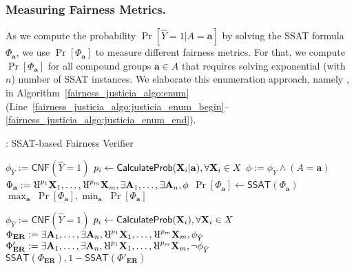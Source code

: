 \subsubsection{Measuring Fairness Metrics.}
As we compute the probability $\Pr[\hat{Y} = 1 | A = \mathbf{a}]$ by solving the SSAT formula $ \Phi_\mathbf{a} $, we  use $ \Pr[\Phi_\mathbf{a}] $ to measure different fairness metrics. 
For that, we compute $ \Pr[\Phi_\mathbf{a}] $ for all compound groups $\mathbf{a} \in A$ that requires solving exponential (with $n$) number of SSAT instances. 
We elaborate this enumeration approach, namely {\justiciaenum}, in Algorithm~\ref{fairness_justicia_algo:enum}  (Line~\ref{fairness_justicia_algo:justicia_enum_begin}--\ref{fairness_justicia_algo:justicia_enum_end}).

\begin{algorithm}[t!]
	\caption{\justicia: SSAT-based Fairness Verifier}
	\label{fairness_justicia_algo:enum}
	\footnotesize
	\begin{algorithmic}[1]
		\label{fairness_justicia_algo:justicia_enum_begin}
		\State $ \phi_{\hat{Y}} := \mathsf{CNF}(\hat{Y} = 1) $
		\State $ p_{i} \leftarrow \mathsf{CalculateProb}(\mathbf{X}_i | \mathbf{a}), \forall \mathbf{X}_i \in X $
		\State $ \phi := \phi_{\hat{Y}} \wedge (A=\mathbf{a}) $
		\State $  \Phi_\mathbf{a} := \R^{p_{1}}\nonsensitive_1, \dots, \R^{p_{m}}\nonsensitive_m, \exists \sensitive_1,\dots, \exists \sensitive_n,  \phi $
		\State $ \Pr[\Phi_\mathbf{a}]  \leftarrow \mathsf{SSAT}(\Phi_\mathbf{a}) $ 
		\EndFor
		\State \Return $ \max_{\mathbf{a}} \; \Pr[\Phi_{\mathbf{a}}], \min_{\mathbf{a}} \; \Pr[\Phi_{\mathbf{a}}] $
		\label{fairness_justicia_algo:justicia_enum_end}
		\EndFunction
		
		
		
		\label{fairness_justicia_algo:justicia_learn_begin}
		\State $ \phi_{\hat{Y}} := \mathsf{CNF}(\hat{Y}  = 1) $
		\State $ p_{i} \leftarrow \mathsf{CalculateProb}(\mathbf{X}_i), \forall \mathbf{X}_i \in X $
		\State $  \Phi_\mathbf{ER} := \exists \sensitive_1,\dots, \exists \sensitive_n, \R^{p_{1}}\nonsensitive_1, \dots, \R^{p_{m}}\nonsensitive_m, \phi_{\hat{Y}} $
		\State $  \Phi'_\mathbf{ER} := \exists \sensitive_1,\dots, \exists \sensitive_n, \R^{p_{1}}\nonsensitive_1, \dots, \R^{p_{m}}\nonsensitive_m, \neg \phi_{\hat{Y}} $
		\State \Return $ \mathsf{SSAT}(\Phi_\mathbf{ER}), 1 - \mathsf{SSAT}(\Phi'_\mathbf{ER}) $
		\label{fairness_justicia_algo:justicia_learn_end}
		\EndFunction
	\end{algorithmic}

\end{algorithm}


